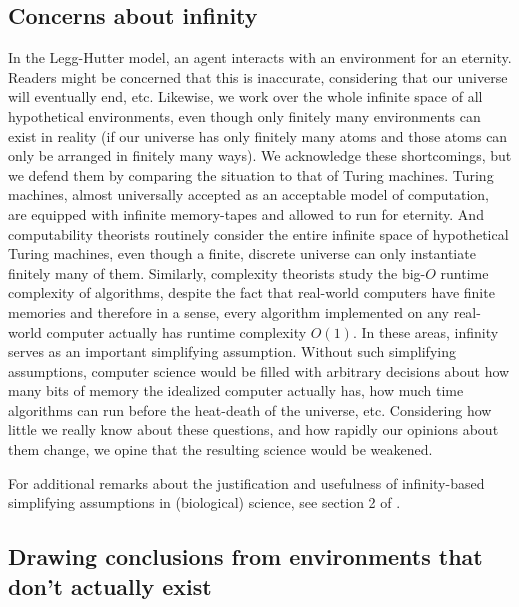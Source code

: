 \documentclass[twoside,11pt]{article}
\begin{document}
\subsection{Concerns about infinity}

In the Legg-Hutter model, an agent interacts with an environment for an eternity.
Readers might be concerned that this is inaccurate, considering that our universe
will eventually end, etc. Likewise, we work over the whole infinite space of
all hypothetical environments, even though only finitely many environments can
exist in reality (if our universe has only finitely many atoms and those
atoms can only be arranged in finitely many ways). We acknowledge these shortcomings,
but we defend them by comparing the situation to that of Turing machines. Turing
machines, almost universally accepted as an acceptable model of computation, are
equipped with infinite memory-tapes and allowed to run for eternity. And
computability theorists routinely consider the entire infinite space of hypothetical
Turing machines, even though a finite, discrete universe can only
instantiate finitely many of them. Similarly, complexity theorists study
the big-$O$ runtime complexity of algorithms, despite the fact that real-world
computers have finite memories and therefore in a sense, every algorithm implemented
on any real-world computer actually has runtime complexity $O(1)$. In these areas,
infinity serves as an important simplifying assumption. Without such simplifying
assumptions, computer science would be filled with arbitrary decisions about
how many bits of memory the idealized computer actually has, how much
time algorithms can run before the heat-death of the universe, etc. Considering
how little we really know about these questions, and how rapidly our opinions about
them change, we opine that the resulting science would be weakened.

For additional remarks about the justification and usefulness of infinity-based
simplifying assumptions in (biological) science, see section 2 of
\cite{alexander2013}.

\subsection{Drawing conclusions from environments that don't actually exist}
\end{document}
